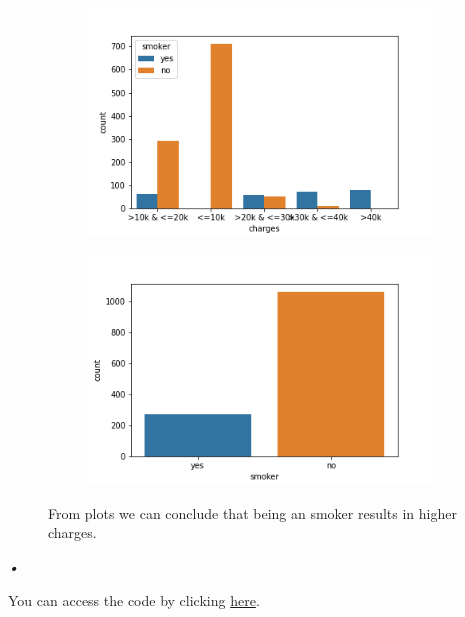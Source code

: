 \documentclass[12pt]{article}
\begin{document}
\begin{figure}[H]
\centering
\begin{subfigure}{0.5\textwidth}
\includegraphics[width=\textwidth]{smoker.png}
\end{subfigure}
\begin{subfigure}{0.5\textwidth}
\includegraphics[width=\textwidth]{smoker_dist.png}
\end{subfigure}
\label{mesh:fig1}
\caption{From plots we can conclude that being an smoker results in higher charges.}
\end{figure}\textit{•}
\begin{center}
You can access the code by clicking \href{https://github.com/narges8k/MachineLearningWorkshop/tree/main/HW1}{here}.
\end{center}
\end{document}
